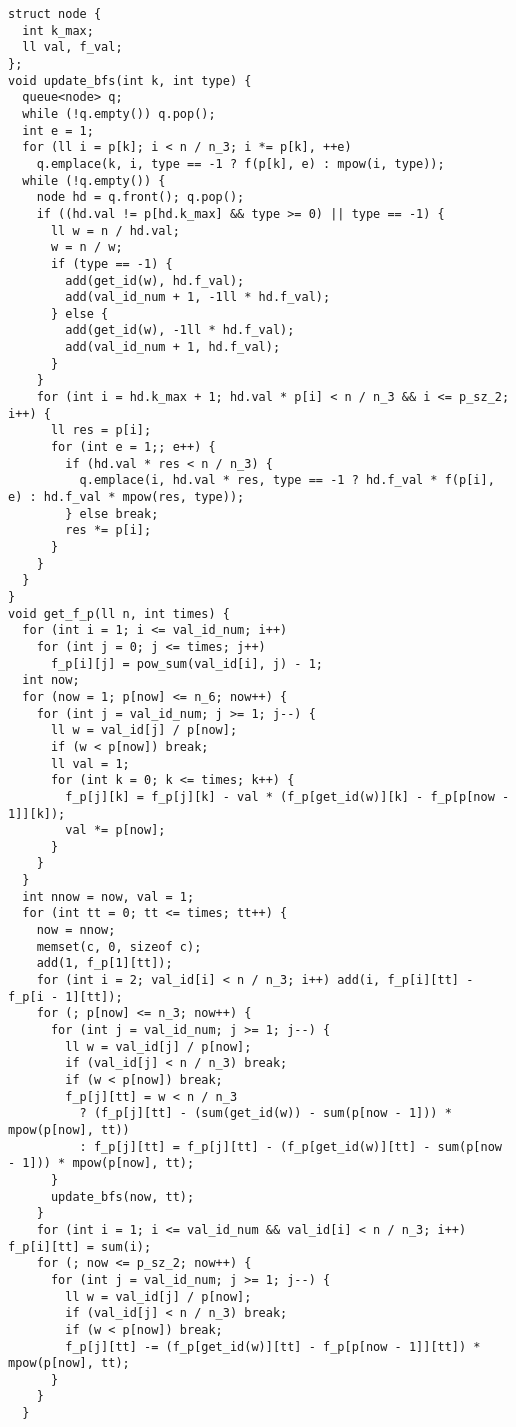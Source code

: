 \begin{lstlisting}
struct node {
  int k_max;
  ll val, f_val;
};
void update_bfs(int k, int type) {
  queue<node> q;
  while (!q.empty()) q.pop();
  int e = 1;
  for (ll i = p[k]; i < n / n_3; i *= p[k], ++e)
    q.emplace(k, i, type == -1 ? f(p[k], e) : mpow(i, type));
  while (!q.empty()) {
    node hd = q.front(); q.pop();
    if ((hd.val != p[hd.k_max] && type >= 0) || type == -1) {
      ll w = n / hd.val;
      w = n / w;
      if (type == -1) {
        add(get_id(w), hd.f_val);
        add(val_id_num + 1, -1ll * hd.f_val);
      } else {
        add(get_id(w), -1ll * hd.f_val);
        add(val_id_num + 1, hd.f_val);
      }
    }
    for (int i = hd.k_max + 1; hd.val * p[i] < n / n_3 && i <= p_sz_2; i++) {
      ll res = p[i];
      for (int e = 1;; e++) {
        if (hd.val * res < n / n_3) {
          q.emplace(i, hd.val * res, type == -1 ? hd.f_val * f(p[i], e) : hd.f_val * mpow(res, type));
        } else break;
        res *= p[i];
      }
    }
  }
}
void get_f_p(ll n, int times) {
  for (int i = 1; i <= val_id_num; i++)
    for (int j = 0; j <= times; j++)
      f_p[i][j] = pow_sum(val_id[i], j) - 1;
  int now;
  for (now = 1; p[now] <= n_6; now++) {
    for (int j = val_id_num; j >= 1; j--) {
      ll w = val_id[j] / p[now];
      if (w < p[now]) break;
      ll val = 1;
      for (int k = 0; k <= times; k++) {
        f_p[j][k] = f_p[j][k] - val * (f_p[get_id(w)][k] - f_p[p[now - 1]][k]);
        val *= p[now];
      }
    }
  }
  int nnow = now, val = 1;
  for (int tt = 0; tt <= times; tt++) {
    now = nnow;
    memset(c, 0, sizeof c);
    add(1, f_p[1][tt]);
    for (int i = 2; val_id[i] < n / n_3; i++) add(i, f_p[i][tt] - f_p[i - 1][tt]);
    for (; p[now] <= n_3; now++) {
      for (int j = val_id_num; j >= 1; j--) {
        ll w = val_id[j] / p[now];
        if (val_id[j] < n / n_3) break;
        if (w < p[now]) break;
        f_p[j][tt] = w < n / n_3
          ? (f_p[j][tt] - (sum(get_id(w)) - sum(p[now - 1])) * mpow(p[now], tt))
          : f_p[j][tt] = f_p[j][tt] - (f_p[get_id(w)][tt] - sum(p[now - 1])) * mpow(p[now], tt);
      }
      update_bfs(now, tt);
    }
    for (int i = 1; i <= val_id_num && val_id[i] < n / n_3; i++) f_p[i][tt] = sum(i);
    for (; now <= p_sz_2; now++) {
      for (int j = val_id_num; j >= 1; j--) {
        ll w = val_id[j] / p[now];
        if (val_id[j] < n / n_3) break;
        if (w < p[now]) break;
        f_p[j][tt] -= (f_p[get_id(w)][tt] - f_p[p[now - 1]][tt]) * mpow(p[now], tt);
      }
    }
  }


\end{lstlisting}
